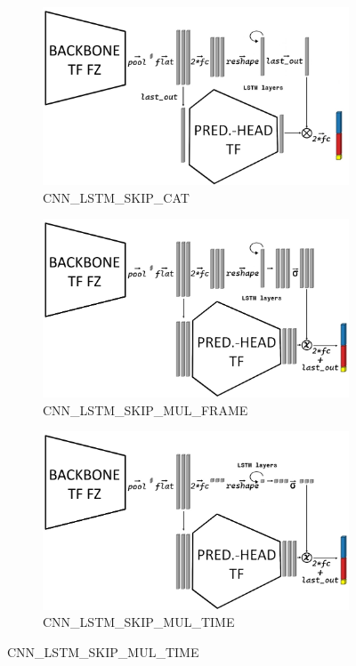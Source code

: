 \begin{figure}[H]
    \begin{subfigure}[b]{0.48\textwidth}
        \centering
        \includegraphics[width=\textwidth]{PICs/temporalModels/SKIP_CAT.png}
        \caption{CNN\_LSTM\_SKIP\_CAT}
    \end{subfigure}
    \hfill
    \begin{subfigure}[b]{0.48\textwidth}
        \centering
        \includegraphics[width=\textwidth]{PICs/temporalModels/SKIP_MUL.png}
        \caption{CNN\_LSTM\_SKIP\_MUL\_FRAME}
    \end{subfigure}
    
    \vspace{0.2cm} %

    \begin{subfigure}[b]{0.48\textwidth}
        \centering
        \includegraphics[width=\textwidth]{PICs/temporalModels/SKIP_MUL_TIME.png}
        \caption{CNN\_LSTM\_SKIP\_MUL\_TIME}
    \end{subfigure}
    

\end{figure}
